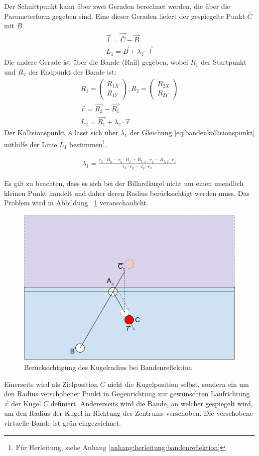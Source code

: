 Der Schnittpunkt kann über zwei Geraden berechnet werden, die über die Parameterform gegeben sind.
Eine dieser Geraden liefert der gespiegelte Punkt $\bar{C}$ mit $B$.
\begin{align}
    \vec{l} = \vec{\bar{C}} - \vec{B}\\
    L_1 = \vec{B} + \lambda_1 \cdot \vec{l}
\end{align}
Die andere Gerade ist über die Bande (Rail) gegeben, wobei $R_1$ der Startpunkt und $R_2$ der Endpunkt der Bande ist:
\begin{align}
    R_1 = \begin{pmatrix}R_{1X}\\R_{1Y}\end{pmatrix}, R_2 = \begin{pmatrix}R_{2X}\\R_{2Y}\end{pmatrix}\\
    \vec{r} = \vec{R_2} - \vec{R_1}\\
    L_2 = \vec{R_1} + \lambda_2 \cdot \vec{r}
\end{align}
Der Kollisionspunkt $A$ lässt sich über $\lambda_1$ der Gleichung \ref{eq:bandenkollisionspunkt} mithilfe der Linie $L_1$
bestimmen\footnote{Für Herleitung, siehe Anhang \ref{anhang:herleitung:bandenreflektion}}.

\begin{align}
    \lambda_1 = \frac{r_x \cdot B_y - r_y \cdot B_x + R_{1,x} \cdot r_y - R_{1,y} \cdot r_x}{l_x \cdot r_y - \cdot l_y \cdot r_x}\label{eq:bandenkollisionspunkt}
\end{align}

Es gilt zu beachten, dass es sich bei der Billardkugel nicht um einen unendlich kleinen Punkt handelt und
daher deren Radius berücksichtigt werden muss.
Das Problem wird in Abbildung ~\ref{fig:bandenreflektion_kugelradius} veranschaulicht.
\begin{figure}[h!]
    \begin{center}
        \includegraphics[width=0.5\linewidth]{../common/03_billiard_ai/resources/48_bandenreflektion_kugelradius.png}
    \end{center}
    \caption{Berücksichtigung des Kugelradius bei Bandenreflektion}
    \label{fig:bandenreflektion_kugelradius}
\end{figure}
Einerseits wird als Zielposition $C$ nicht die Kugelposition selbst, sondern ein um den Radius verschobener Punkt in
Gegenrichtung zur gewünschten Laufrichtung $\vec{r}$ der Kugel $C$ definiert. Andererseits wird die Bande, an welcher
gespiegelt wird, um den Radius der Kugel in Richtung des Zentrums verschoben. Die verschobene virtuelle Bande ist grün eingezeichnet.

